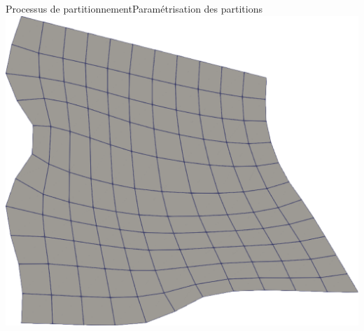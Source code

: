 \documentclass[compress,10pt,aspectratio=169]{beamer}
\begin{document}
\begin{frame}{Processus de partitionnement}{Paramétrisation des partitions}
{\includegraphics[scale=0.1]{images/quad_equation_4.pdf}
}



\end{frame}
\end{document}
